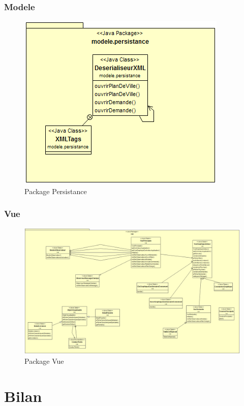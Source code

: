 \documentclass[10pt,a4paper]{book}
\begin{document}
\subsection{Modele}
\begin{figure}[h!]
    \centering
    \includegraphics[scale=0.28]{DcPersistance.png}
    \caption{Package Persistance}
\end{figure}
\subsection{Vue}
\begin{figure}[h!]
    \centering
    \includegraphics[scale=0.28]{DcVue.png}
    \caption{Package Vue}
\end{figure}
\chapter{Bilan}
\end{document}
